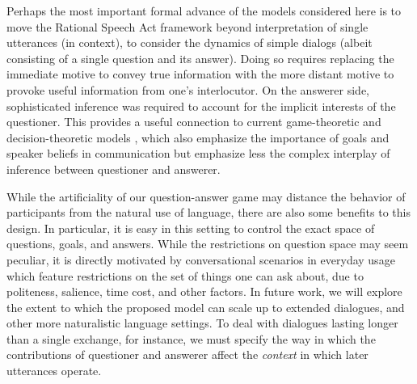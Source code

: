 \documentclass[12pt, floatsintext, jou]{apa6}
\begin{document}
Perhaps the most important formal advance of the models considered here is to move the Rational Speech Act framework beyond interpretation of single utterances (in context), to consider the dynamics of simple dialogs (albeit consisting of a single question and its answer). 
Doing so requires replacing the immediate motive to convey true information with the more distant motive to provoke useful information from one's interlocutor. On the answerer side, sophisticated inference was required to account for the implicit interests of the questioner. This provides a useful connection to current game-theoretic and decision-theoretic models \cite{VogelBodoiaPottsJurafsky13_GricePOMDP, VanRooy03_QuestioningDecisionProblems}, which also emphasize the importance of goals and speaker beliefs in communication but emphasize less the complex interplay of inference between questioner and answerer.



While the artificiality of our question-answer game may distance the behavior of participants from the natural use of language, there are also some benefits to this design. In particular, it is easy in this setting to control the exact space of questions, goals, and answers. While the restrictions on question space may seem peculiar, it is directly motivated by conversational scenarios in everyday usage which feature restrictions on the set of things one can ask about, due to politeness, salience, time cost, and other factors. In future work, we will explore the extent to which the proposed model can scale up to extended dialogues, and other more naturalistic language settings. To deal with dialogues lasting longer than a single exchange, for instance, we must specify the way in which the contributions of questioner and answerer affect the \emph{context} in which later utterances operate. 
\end{document}
